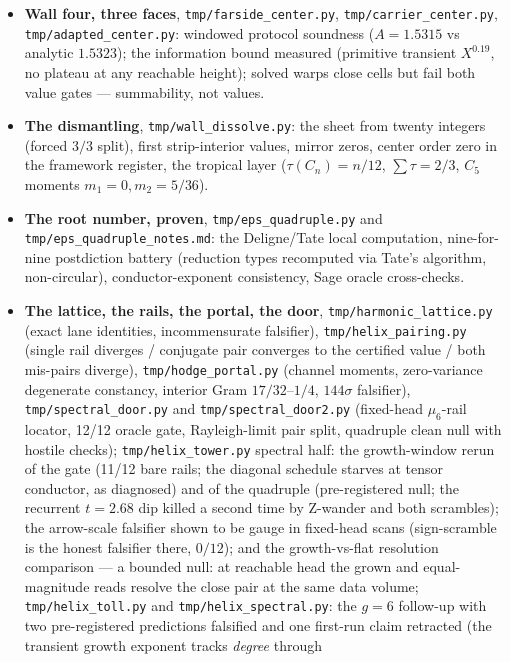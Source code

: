 \documentclass[11pt]{article}
\theoremstyle{definition}
\theoremstyle{remark}
\begin{document}
\begin{itemize}
$\theta_p$ caches ($148{,}933$ primes to $2\times10^6$).
\item \textbf{Wall four, three faces}, \texttt{tmp/farside\_center.py},
\texttt{tmp/carrier\_center.py}, \texttt{tmp/adapted\_center.py}: windowed
protocol soundness ($A=1.5315$ vs analytic $1.5323$); the information bound
measured (primitive transient $X^{0.19}$, no plateau at any reachable
height); solved warps close cells but fail both value gates ---
summability, not values.
\item \textbf{The dismantling}, \texttt{tmp/wall\_dissolve.py}: the sheet from
twenty integers (forced $3/3$ split), first strip-interior values, mirror
zeros, center order zero in the framework register, the tropical layer
($\tau(C_n)=n/12$, $\sum\tau=2/3$, $C_5$ moments $m_1=0,m_2=5/36$).
\item \textbf{The root number, proven}, \texttt{tmp/eps\_quadruple.py} and
\texttt{tmp/eps\_quadruple\_notes.md}: the Deligne/Tate local computation,
nine-for-nine postdiction battery (reduction types recomputed via Tate's
algorithm, non-circular), conductor-exponent consistency, Sage oracle
cross-checks.
\item \textbf{The lattice, the rails, the portal, the door},
\texttt{tmp/harmonic\_lattice.py} (exact lane identities, incommensurate
falsifier), \texttt{tmp/helix\_pairing.py} (single rail diverges / conjugate
pair converges to the certified value / both mis-pairs diverge),
\texttt{tmp/hodge\_portal.py} (channel moments, zero-variance degenerate
constancy, interior Gram $17/32$--$1/4$, $144\sigma$ falsifier),
\texttt{tmp/spectral\_door.py} and \texttt{tmp/spectral\_door2.py} (fixed-head
$\mu_6$-rail locator, 12/12 oracle gate, Rayleigh-limit pair split, quadruple
clean null with hostile checks);
\texttt{tmp/helix\_tower.py} spectral half: the growth-window rerun of the
gate (11/12 bare rails; the diagonal schedule starves at tensor conductor,
as diagnosed) and of the quadruple (pre-registered null; the recurrent
$t=2.68$ dip killed a second time by Z-wander and both scrambles); the
arrow-scale falsifier shown to be gauge in fixed-head scans (sign-scramble
is the honest falsifier there, $0/12$); and the growth-vs-flat resolution
comparison --- a bounded null: at reachable head the grown and
equal-magnitude reads resolve the close pair at the same data volume;
\texttt{tmp/helix\_toll.py} and \texttt{tmp/helix\_spectral.py}: the $g=6$
follow-up with two pre-registered predictions falsified and one first-run
claim retracted (the transient growth exponent tracks \emph{degree} through

\end{itemize}
\end{document}
